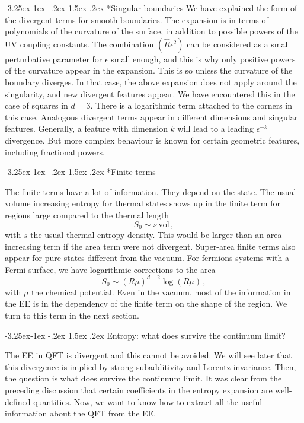 \documentclass[11pt,a4paper]{article}
\makeatletter
\renewcommand\subsection{\@startsection{subsection}{2}{\z@}%
                                   {-3.25ex\@plus -1ex \@minus -.2ex}%
                                     {1.5ex \@plus .2ex}%
                                     {\normalfont\bfseries}}
\renewcommand\subsubsection{\@startsection{subsubsection}{3}{\z@}%
                                   {-3.25ex\@plus -1ex \@minus -.2ex}%
                                     {1.5ex \@plus .2ex}%
                                     {\normalfont\itshape}}
\numberwithin{equation}{section}
\newcommand{\be}{\begin{equation}}
\newcommand{\ee}{\end{equation}}
\makeatother
\begin{document}
\subsubsection*{Singular boundaries}
We have explained the form of the divergent terms for smooth boundaries. 
The expansion is in terms of polynomials of the curvature of the surface, in addition to possible powers of the UV coupling constants. 
 The combination $(\hat{R}\epsilon^2)$ can be considered as a small perturbative parameter for $\epsilon$ small enough, and this is why only positive powers of the curvature appear in the expansion.  This is so unless the curvature of the boundary diverges. In that case, the above expansion does not apply around the singularity, and new divergent features appear.
 We have encountered this in the case of squares in $d=3$. There is a logarithmic term attached to the corners in this case. Analogous divergent terms appear in different dimensions and singular features. Generally, a feature with dimension $k$ will lead to a leading $\epsilon^{-k}$ divergence. But more complex behaviour is known for certain geometric features, including fractional powers.  

\subsubsection*{Finite terms}

The finite terms have a lot of information. They depend on the state. The usual volume increasing entropy for thermal states shows up in the finite term for regions large compared to the thermal length
\be
S_0\sim s\,\textrm{vol}\,,  
\ee
with $s$ the usual thermal entropy density. This would be larger than an area increasing term if the area term were not divergent. Super-area finite terms also appear for pure states different from the vacuum. For fermions systems with a Fermi surface, we have logarithmic corrections to the area 
\be
S_0\sim (R\mu)^{d-2} \log(R \mu)\,,  
\ee
with $\mu$ the chemical potential. Even in the vacuum, most of the information in the EE is in the dependency of the finite term on the shape of the region.   
We turn to this term in the next section. 

\subsection{Entropy: what does survive the continuum limit?}
\label{regent}


The EE in QFT is divergent and this cannot be avoided. We will see later that this divergence is implied by strong subadditivity and Lorentz invariance. Then, the question is what does survive the continuum limit. It was clear from the preceding discussion that certain coefficients in the entropy expansion are well-defined quantities. Now, we want to know how to extract all the useful information about the QFT from the EE.
  
\end{document}
